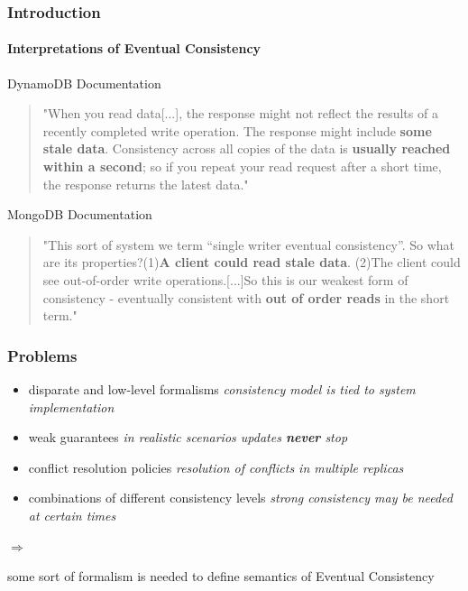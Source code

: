 \documentclass[11pt]{beamer}
\begin{document}
\begin{frame}
\frametitle{Introduction}
\framesubtitle{Interpretations of Eventual Consistency}
\begin{footnotesize}
\begin{block}{DynamoDB Documentation}
\begin{quotation}
"When you read data[...], the response might not reflect the results of a recently completed write operation. The response might include \textbf{some stale data}. Consistency across all copies of the data is \textbf{usually reached within a second}; so if you repeat your read request after a short time, the response returns the latest data."
\end{quotation}
\end{block}

\begin{block}{MongoDB Documentation}
\begin{quotation}
"This sort of system we term “single writer eventual consistency”. So what are its properties?\linebreak (1)\textbf{A client could read stale data}. \linebreak(2)The client could see out-of-order write operations.[...]\linebreak So this is our weakest form of consistency - eventually consistent with \textbf{out of order reads} in the short term."
\end{quotation}
\end{block}
\end{footnotesize}
\end{frame}

\begin{frame}
\frametitle{Problems}
\begin{itemize}
\item disparate and low-level formalisms\linebreak 
\textit{consistency model is tied to system implementation}
\pause
\item weak guarantees\linebreak 
\textit{in realistic scenarios updates \textbf{never} stop}
\pause
\item conflict resolution policies\linebreak 
\textit{resolution of conflicts in multiple replicas}
\pause
\item combinations of different consistency levels\linebreak 
\textit{strong consistency may be needed at certain times} 
\end{itemize}
\pause
\begin{large}
\ensuremath{\Rightarrow}
\end{large}
some sort of formalism is needed to define semantics of Eventual Consistency
\end{frame}
\end{document}
